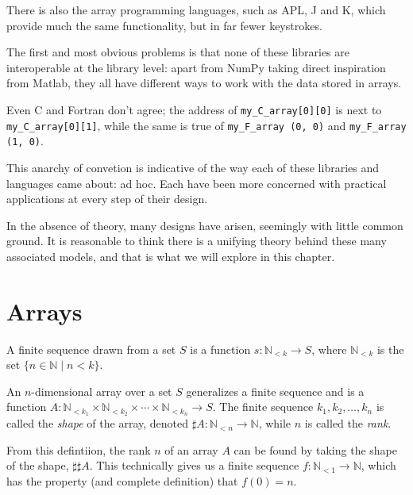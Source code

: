 \documentclass{DIKU-report-variant}
\newcommand\Nat{\mathbb{N}}
\begin{document}
There is also the array programming languages, such as APL, J and K, which provide
much the same functionality, but in far fewer keystrokes.

The first and most obvious problems is that none of these libraries are interoperable
at the library level: apart from NumPy taking direct inspiration from Matlab, they
all have different ways to work with the data stored in arrays.

Even C and Fortran don't agree; the address of \texttt{my\_C\_array[0][0]} is next
to \texttt{my\_C\_array[0][1]}, while the same is true of \texttt{my\_F\_array (0, 0)}
and \texttt{my\_F\_array (1, 0)}.

This anarchy of convetion is indicative of the way each of these libraries and
languages came about: ad hoc. Each have been more concerned with practical applications
at every step of their design.

In the absence of theory, many designs have arisen, seemingly with little common
ground. It is reasonable to think there is a unifying theory behind these many associated
models, and that is what we will explore in this chapter.

\section{Arrays}

\begin{definition}
  \label{def:finseq}
  A finite sequence drawn from a set \(S\) is a function \(s : \Nat_{<k} \to S\),
  where \(\Nat_{<k}\) is the set \(\{ n \in \Nat \mid n < k \}\).
\end{definition}

\begin{definition}
  \label{def:array}
  An \(n\)-dimensional array over a set \(S\) generalizes a finite sequence and
  is a function \(A : \Nat_{<k_1} \times \Nat_{<k_2} \times \cdots \times \Nat_{<k_n} \to S\).
  The finite sequence \(k_1, k_2, \dots, k_n\) is called the \emph{shape} of the array, denoted
  \(\sharp A : \Nat_{<n} \to \Nat\), while \(n\) is called the \emph{rank}.
\end{definition}

\begin{observation}
  \label{ob:rank}
  From this defintiion, the rank \(n\) of an array \(A\) can be found by taking the
  shape of the shape, \(\sharp\sharp A\). This technically gives us a finite sequence
  \(f : \Nat_{<1} \to \Nat\), which has the property (and complete definition) that \(f(0) = n\).
\end{observation}
\end{document}

